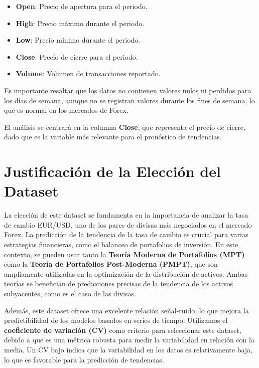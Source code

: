 \documentclass[
]{book}
\providecommand{\tightlist}{%
  \setlength{\itemsep}{0pt}\setlength{\parskip}{0pt}}
\begin{document}
\begin{itemize}
\tightlist
\item
  \textbf{Open}: Precio de apertura para el periodo.
\item
  \textbf{High}: Precio máximo durante el periodo.
\item
  \textbf{Low}: Precio mínimo durante el periodo.
\item
  \textbf{Close}: Precio de cierre para el periodo.
\item
  \textbf{Volume}: Volumen de transacciones reportado.
\end{itemize}

Es importante resaltar que los datos no contienen valores nulos ni perdidos para los días de semana, aunque no se registran valores durante los fines de semana, lo que es normal en los mercados de Forex.

El análisis se centrará en la columna \textbf{Close}, que representa el precio de cierre, dado que es la variable más relevante para el pronóstico de tendencias.

\section{Justificación de la Elección del Dataset}\label{justificaciuxf3n-de-la-elecciuxf3n-del-dataset}

La elección de este dataset se fundamenta en la importancia de analizar la tasa de cambio EUR/USD, uno de los pares de divisas más negociados en el mercado Forex. La predicción de la tendencia de la tasa de cambio es crucial para varias estrategias financieras, como el balanceo de portafolios de inversión. En este contexto, se pueden usar tanto la \textbf{Teoría Moderna de Portafolios (MPT)} como la \textbf{Teoría de Portafolios Post-Moderna (PMPT)}, que son ampliamente utilizadas en la optimización de la distribución de activos. Ambas teorías se benefician de predicciones precisas de la tendencia de los activos subyacentes, como es el caso de las divisas.

Además, este dataset ofrece una excelente relación señal-ruido, lo que mejora la predictibilidad de los modelos basados en series de tiempo. Utilizamos el \textbf{coeficiente de variación (CV)} como criterio para seleccionar este dataset, debido a que es una métrica robusta para medir la variabilidad en relación con la media. Un CV bajo indica que la variabilidad en los datos es relativamente baja, lo que es favorable para la predicción de tendencias.
\end{document}
